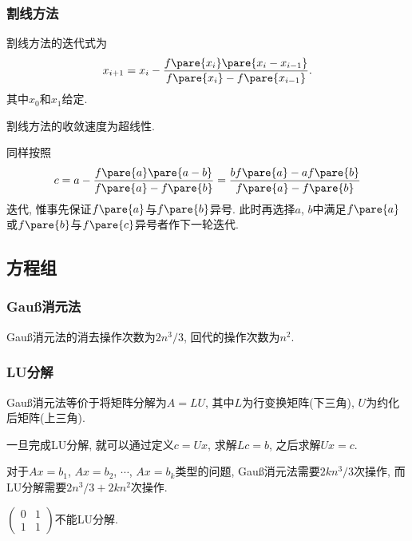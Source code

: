 \documentclass[20pt]{extarticle}
\begin{document}

\subsubsection{割线方法} %
\label{ssub:割线方法}

\begin{theorem}
    割线方法的迭代式为
    \[ x_{i+1} = x_i - \frac{f\pare{x_i}\pare{x_i - x_{i-1}}}{f\pare{x_i} - f\pare{x_{i-1}}}. \]
    其中$x_0$和$x_1$给定.
\end{theorem}
割线方法的收敛速度为超线性.
\begin{theorem}
    同样按照
    \[ c = a - \frac{f\pare{a}\pare{a-b}}{f\pare{a} - f\pare{b}} = \frac{bf\pare{a} - af\pare{b}}{f\pare{a} - f\pare{b}} \]
    迭代, 惟事先保证$f\pare{a}$与$f\pare{b}$异号. 此时再选择$a$, $b$中满足$f\pare{a}$或$f\pare{b}$与$f\pare{c}$异号者作下一轮迭代.
\end{theorem}



\subsection{方程组} %
\label{sub:方程组}

\subsubsection{\texorpdfstring{Gau\ss}{Gauss}消元法} %
\label{ssub:gauss消元法}

Gau\ss 消元法的消去操作次数为$2n^3/3$, 回代的操作次数为$n^2$.


\subsubsection{LU分解} %
\label{ssub:lu分解}

Gau\ss 消元法等价于将矩阵分解为$A=LU$, 其中$L$为行变换矩阵(下三角), $U$为约化后矩阵(上三角).
\par
一旦完成LU分解, 就可以通过定义$c=Ux$, 求解$Lc=b$, 之后求解$Ux=c$.
\par
对于$Ax=b_1$, $Ax=b_2$, $\cdots$, $Ax=b_k$类型的问题, Gau\ss 消元法需要$2kn^3/3$次操作, 而LU分解需要$2n^3/3 + 2kn^2$次操作.
\begin{ex}[并非所有矩阵都有LU分解]
    $\displaystyle \begin{pmatrix}
        0 & 1 \\ 1 & 1
    \end{pmatrix}$不能LU分解.
\end{ex}
\end{document}
